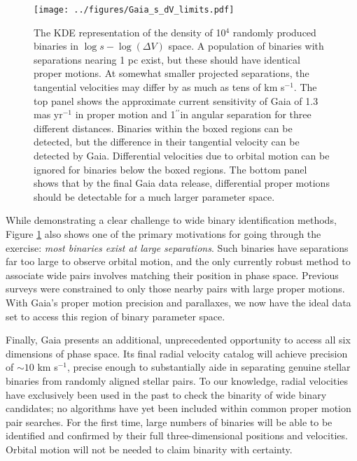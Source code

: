 \documentclass[usenatbib]{mnras}
\newcommand{\asec}{\ifmmode {^{\prime\prime}}\else$^{\prime\prime}$\fi}
\begin{document}
\begin{figure}
\begin{center}
\texttt{[image: ../figures/Gaia\_s\_dV\_limits.pdf]}
\caption{ The KDE representation of the density of 10$^4$ randomly produced binaries in $\log s- \log(\Delta V)$ space. A population of binaries with separations nearing 1 pc exist, but these should have identical proper motions. At somewhat smaller projected separations, the tangential velocities may differ by as much as tens of km s$^{-1}$. The top panel shows the approximate current sensitivity of Gaia of 1.3 mas yr$^{-1}$ in proper motion and 1\asec in angular separation for three different distances. Binaries within the boxed regions can be detected, but the difference in their tangential velocity can be detected by Gaia. Differential velocities due to orbital motion can be ignored for binaries below the boxed regions. The bottom panel shows that by the final Gaia data release, differential proper motions should be detectable for a much larger parameter space. }
\label{fig:gaia_binary_limits}
\end{center}
\end{figure}

While demonstrating a clear challenge to wide binary identification methods, Figure \ref{fig:gaia_binary_limits} also shows one of the primary motivations for going through the exercise: {\it most binaries exist at large separations}. Such binaries have separations far too large to observe orbital motion, and the only currently robust method to associate wide pairs involves matching their position in phase space. Previous surveys were constrained to only those nearby pairs with large proper motions. With Gaia's proper motion precision and parallaxes, we now have the ideal data set to access this region of binary parameter space. 


Finally, Gaia presents an additional, unprecedented opportunity to access all six dimensions of phase space. Its final radial velocity catalog will achieve precision of $\sim 10$ km s$^{-1}$, precise enough to substantially aide in separating genuine stellar binaries from randomly aligned stellar pairs. To our knowledge, radial velocities have exclusively been used in the past to check the binarity of wide binary candidates; no algorithms have yet been included within common proper motion pair searches. For the first time, large numbers of binaries will be able to be identified and confirmed by their full three-dimensional positions and velocities. Orbital motion will not be needed to claim binarity with certainty.
\end{document}
